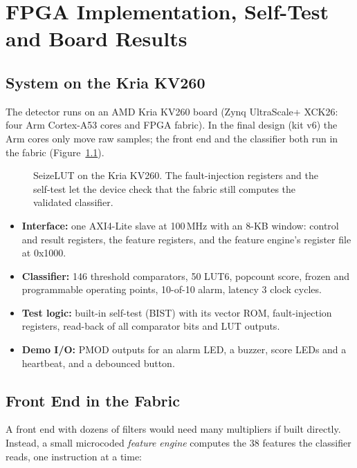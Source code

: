 \chapter{FPGA Implementation, Self-Test and Board Results}\label{ch:hw}

\section{System on the Kria KV260}

The detector runs on an AMD Kria KV260 board (Zynq UltraScale+ XCK26: four Arm Cortex-A53 cores and FPGA fabric).
In the final design (kit v6) the Arm cores only move raw samples; the front end and the classifier both run in the
fabric (Figure~\ref{fig:arch}).

\begin{figure}[H]
\centering
\resizebox{\textwidth}{!}{}
\caption{SeizeLUT on the Kria KV260. The fault-injection registers and the self-test let the device check that the
fabric still computes the validated classifier.}\label{fig:arch}
\end{figure}

\begin{itemize}
\item \textbf{Interface:} one AXI4-Lite slave at 100\,MHz with an 8-KB window: control and result registers, the
  feature registers, and the feature engine's register file at 0x1000.
\item \textbf{Classifier:} 146 threshold comparators, 50 LUT6, popcount score, frozen and programmable operating
  points, 10-of-10 alarm, latency 3 clock cycles.
\item \textbf{Test logic:} built-in self-test (BIST) with its vector ROM, fault-injection registers, read-back of
  all comparator bits and LUT outputs.
\item \textbf{Demo I/O:} PMOD outputs for an alarm LED, a buzzer, score LEDs and a heartbeat, and a debounced button.
\end{itemize}

\section{Front End in the Fabric}\label{sec:fe-engine}

A front end with dozens of filters would need many multipliers if built directly. Instead, a small microcoded
\emph{feature engine} computes the 38 features the classifier reads, one instruction at a time:

